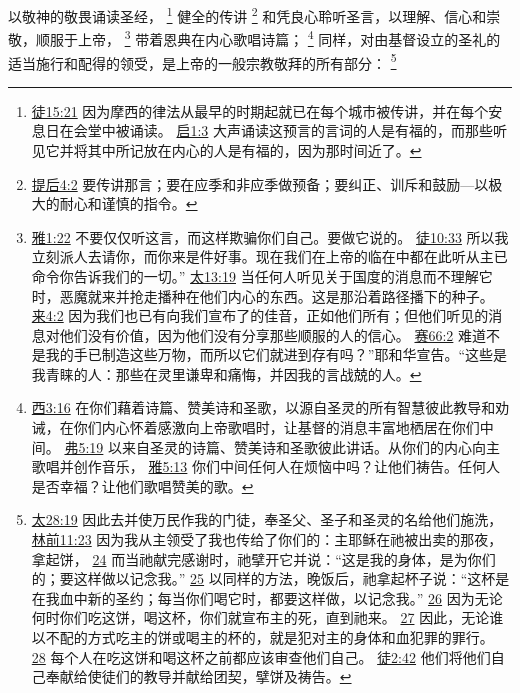 \documentclass[12pt, a4paper, oneside]{ctexart}
\newcounter{parnum}[section]
\newcommand{\N}{%
   \noindent\refstepcounter{parnum}%
    \makebox[\parindent][l]{\textbf{\arabic{parnum}.}}}
\begin{document}
\N 以敬神的敬畏诵读圣经，
	\footnote {
		\href{https://biblehub.com/acts/15-21.htm}{徒15:21} 因为摩西的律法从最早的时期起就已在每个城市被传讲，并在每个安息日在会堂中被诵读。
		\href{https://biblehub.com/revelation/1-3.htm}{启1:3} 大声诵读这预言的言词的人是有福的，而那些听见它并将其中所记放在内心的人是有福的，因为那时间近了。
	}
	健全的传讲
	\footnote {
		\href{https://biblehub.com/2_timothy/4-2.htm}{提后4:2} 要传讲那言；要在应季和非应季做预备；要纠正、训斥和鼓励---以极大的耐心和谨慎的指令。
	}
	和凭良心聆听圣言，以理解、信心和崇敬，顺服于上帝，
	\footnote {
		\href{https://biblehub.com/james/1-22.htm}{雅1:22} 不要仅仅听这言，而这样欺骗你们自己。要做它说的。
		\href{https://biblehub.com/acts/10-33.htm}{徒10:33} 所以我立刻派人去请你，而你来是件好事。现在我们在上帝的临在中都在此听从主已命令你告诉我们的一切。”
		\href{https://biblehub.com/matthew/13-19.htm}{太13:19} 当任何人听见关于国度的消息而不理解它时，恶魔就来并抢走播种在他们内心的东西。这是那沿着路径播下的种子。
		\href{https://biblehub.com/hebrews/4-2.htm}{来4:2} 因为我们也已有向我们宣布了的佳音，正如他们所有；但他们听见的消息对他们没有价值，因为他们没有分享那些顺服的人的信心。
		\href{https://biblehub.com/isaiah/66-2.htm}{赛66:2} 难道不是我的手已制造这些万物，而所以它们就进到存有吗？”耶和华宣告。“这些是我青睐的人：那些在灵里谦卑和痛悔，并因我的言战兢的人。
	}
	带着恩典在内心歌唱诗篇；
	\footnote {
		\href{https://biblehub.com/colossians/3-16.htm}{西3:16} 在你们藉着诗篇、赞美诗和圣歌，以源自圣灵的所有智慧彼此教导和劝诫，在你们内心怀着感激向上帝歌唱时，让基督的消息丰富地栖居在你们中间。
		\href{https://biblehub.com/ephesians/5-19.htm}{弗5:19} 以来自圣灵的诗篇、赞美诗和圣歌彼此讲话。从你们的内心向主歌唱并创作音乐，
		\href{https://biblehub.com/james/5-13.htm}{雅5:13} 你们中间任何人在烦恼中吗？让他们祷告。任何人是否幸福？让他们歌唱赞美的歌。
	}
	同样，对由基督设立的圣礼的适当施行和配得的领受，是上帝的一般宗教敬拜的所有部分：
	\footnote {
		\href{https://biblehub.com/matthew/28-19.htm}{太28:19} 因此去并使万民作我的门徒，奉圣父、圣子和圣灵的名给他们施洗，
		\href{https://biblehub.com/1_corinthians/11-23.htm}{林前11:23} 因为我从主领受了我也传给了你们的：主耶稣在祂被出卖的那夜，拿起饼，
		\href{https://biblehub.com/1_corinthians/11-24.htm}{24} 而当祂献完感谢时，祂擘开它并说：“这是我的身体，是为你们的；要这样做以记念我。”
		\href{https://biblehub.com/1_corinthians/11-25.htm}{25} 以同样的方法，晚饭后，祂拿起杯子说：“这杯是在我血中新的圣约；每当你们喝它时，都要这样做，以记念我。”
		\href{https://biblehub.com/1_corinthians/11-26.htm}{26} 因为无论何时你们吃这饼，喝这杯，你们就宣布主的死，直到祂来。
		\href{https://biblehub.com/1_corinthians/11-27.htm}{27} 因此，无论谁以不配的方式吃主的饼或喝主的杯的，就是犯对主的身体和血犯罪的罪行。
		\href{https://biblehub.com/1_corinthians/11-28.htm}{28} 每个人在吃这饼和喝这杯之前都应该审查他们自己。
		\href{https://biblehub.com/acts/2-42.htm}{徒2:42} 他们将他们自己奉献给使徒们的教导并献给团契，擘饼及祷告。
	}
\end{document}

